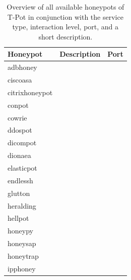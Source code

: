 \begin{table}[ht]
    \centering
    \caption[Overview honeypots of T-Pot]{Overview of all available honeypots of T-Pot in conjunction with the service type, interaction level, port, and a short description.}
    \begin{tabularx}{\linewidth}{l|l|l}
        \toprule
        \textbf{Honeypot}                        & \textbf{Description} & \textbf{Port} \\
        \hline
        adbhoney \cite{adbhoney2021}             &                      &               \\
        ciscoasa \cite{cymmetria2018}            &                      &               \\
        citrixhoneypot \cite{citrixhoneypot2020} &                      &               \\
        conpot \cite{conpot2021}                 &                      &               \\
        cowrie \cite{cowire2021}                 &                      &               \\
        ddospot \cite{ddosspot2021}              &                      &               \\
        dicompot \cite{dicompot2021}             &                      &               \\
        dionaea \cite{dionaea2021}               &                      &               \\
        elasticpot \cite{elasticpot2021}         &                      &               \\
        endlessh \cite{endlessh2021}             &                      &               \\
        glutton \cite{glutton2021}               &                      &               \\
        heralding \cite{heralding2021}           &                      &               \\
        hellpot \cite{hellpot2021}               &                      &               \\
        honeypy \cite{honeysap2021}              &                      &               \\
        honeysap \cite{honeysap2021}             &                      &               \\
        honeytrap \cite{honeytrap2021}           &                      &               \\
        ipphoney \cite{ipphoney2021}             &                      &               \\

\end{tabularx}
\end{table}
